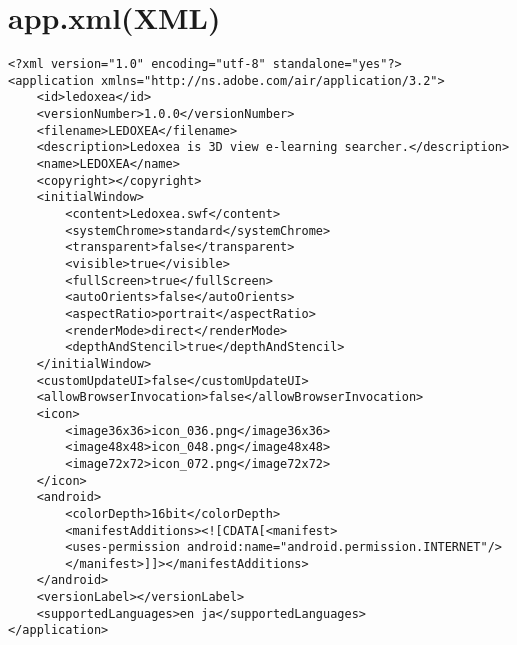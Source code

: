 \section{app.xml(XML)}
{\scriptsize
\begin{verbatim}
<?xml version="1.0" encoding="utf-8" standalone="yes"?>
<application xmlns="http://ns.adobe.com/air/application/3.2">
    <id>ledoxea</id>
    <versionNumber>1.0.0</versionNumber>
    <filename>LEDOXEA</filename>
    <description>Ledoxea is 3D view e-learning searcher.</description>
    <name>LEDOXEA</name>
    <copyright></copyright>
    <initialWindow>
        <content>Ledoxea.swf</content>
        <systemChrome>standard</systemChrome>
        <transparent>false</transparent>
        <visible>true</visible>
        <fullScreen>true</fullScreen>
        <autoOrients>false</autoOrients>
        <aspectRatio>portrait</aspectRatio>
        <renderMode>direct</renderMode>
        <depthAndStencil>true</depthAndStencil>
    </initialWindow>
    <customUpdateUI>false</customUpdateUI>
    <allowBrowserInvocation>false</allowBrowserInvocation>
    <icon>
        <image36x36>icon_036.png</image36x36>
        <image48x48>icon_048.png</image48x48>
        <image72x72>icon_072.png</image72x72>
    </icon>
    <android>
        <colorDepth>16bit</colorDepth>
        <manifestAdditions><![CDATA[<manifest>
		<uses-permission android:name="android.permission.INTERNET"/>
		</manifest>]]></manifestAdditions>
    </android>
    <versionLabel></versionLabel>
    <supportedLanguages>en ja</supportedLanguages>
</application>
\end{verbatim}
 }
